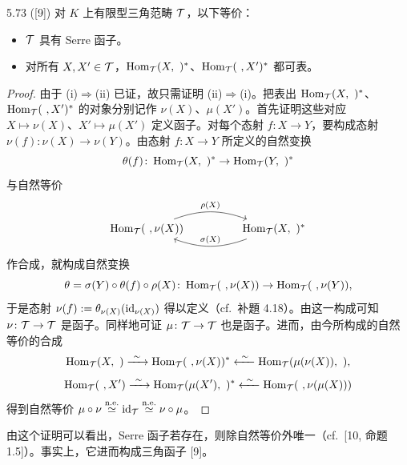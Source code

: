 
\begin{lemma}{5.73} ([9]) 对 $K$ 上有限型三角范畴 $\mathcal{T}$，以下等价：
\begin{itemize}
  \item[(i)] $\mathcal{T}$ 具有 Serre 函子。
  \item[(ii)] 对所有 $X,X' \in \mathcal{T}$，$\operatorname{Hom}_{\mathcal{T}}(X,\ )^{*}$、$\operatorname{Hom}_{\mathcal{T}}(\ ,X')^{*}$ 都可表。
\end{itemize}
\end{lemma}

\begin{proof}
由于 (i)$\Rightarrow$(ii) 已证，故只需证明 (ii)$\Rightarrow$(i)。把表出 $\operatorname{Hom}_{\mathcal{T}}(X,\ )^{*}$、$\operatorname{Hom}_{\mathcal{T}}(\ ,X')^{*}$ 的对象分别记作 $\nu(X)$、$\mu(X')$。首先证明这些对应 $X \mapsto \nu(X)$、$X' \mapsto \mu(X')$ 定义函子。对每个态射 $f \colon X \to Y$，要构成态射 $\nu(f) \colon \nu(X) \to \nu(Y)$。由态射 $f \colon X \to Y$ 所定义的自然变换
\[
  \theta(f) \colon \operatorname{Hom}_{\mathcal{T}}(X,\ )^{*} \to \operatorname{Hom}_{\mathcal{T}}(Y,\ )^{*}
\]
与自然等价
\[
\begin{tikzcd}[row sep=1.6em, column sep=4.4em]
  \Hom_{\cT}(\ ,\nu(X)) \arrow[r, bend left=20, "\rho(X)"] & \Hom_{\cT}(X,\ )^{*} \arrow[l, bend left=20, "\sigma(X)"']
\end{tikzcd}
\]
作合成，就构成自然变换
\[
  \theta = \sigma(Y)\circ\theta(f)\circ\rho(X) \colon \operatorname{Hom}_{\mathcal{T}}(\ ,\nu(X)) \to \operatorname{Hom}_{\mathcal{T}}(\ ,\nu(Y)),
\]
于是态射 $\nu(f) := \theta_{\nu(X)}(\mathrm{id}_{\nu(X)})$ 得以定义（cf.\ 补題 4.18）。由这一构成可知 $\nu \colon \mathcal{T} \to \mathcal{T}$ 是函子。同样地可证 $\mu \colon \mathcal{T} \to \mathcal{T}$ 也是函子。进而，由今所构成的自然等价的合成
\[
  \Hom_{\cT}(X,\ ) \xrightarrow{\ \sim\ } \Hom_{\cT}(\ ,\nu(X))^{*} \xleftarrow{\ \sim\ } \Hom_{\cT}(\mu(\nu(X)),\ ),
\]
\[
  \operatorname{Hom}_{\mathcal{T}}(\ ,X') \xrightarrow{\ \sim\ } \operatorname{Hom}_{\mathcal{T}}(\mu(X'),\ )^{*} \xleftarrow{\ \sim\ } \operatorname{Hom}_{\mathcal{T}}(\ ,\nu(\mu(X)))
\]
得到自然等价 $\mu\circ\nu \overset{\mathrm{n.e.}}{\simeq} \mathrm{id}_{\mathcal{T}} \overset{\mathrm{n.e.}}{\simeq} \nu\circ\mu$。
\end{proof}


由这个证明可以看出，Serre 函子若存在，则除自然等价外唯一（cf.\ [10, 命题 1.5]）。事实上，它进而构成三角函子 [9]。

